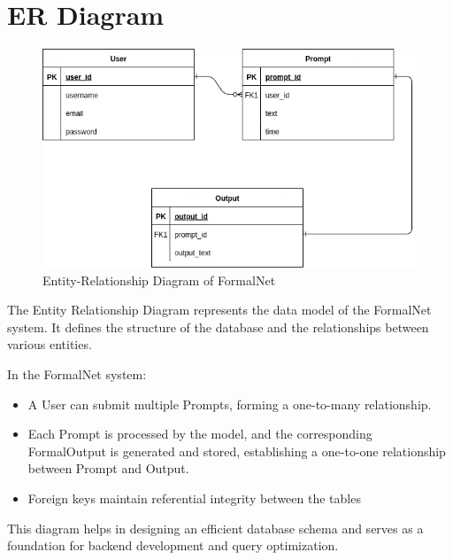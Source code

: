 \section{ER Diagram}
\begin{figure}[H]
  \centering
  \includegraphics[width=1\textwidth]{images/er_diagram.png}
  \caption{Entity-Relationship Diagram of FormalNet}
  \label{fig:er}
\end{figure}
The Entity Relationship Diagram represents the data model of the FormalNet system. It defines the structure of the database and the relationships between various entities.

In the FormalNet system:
\begin{itemize}
    \item A User can submit multiple Prompts, forming a one-to-many relationship.
    \item Each Prompt is processed by the model, and the corresponding FormalOutput is generated and stored, establishing a one-to-one relationship between Prompt and Output.
    \item Foreign keys maintain referential integrity between the tables
\end{itemize}
This diagram helps in designing an efficient database schema and serves as a foundation for backend development and query optimization.


